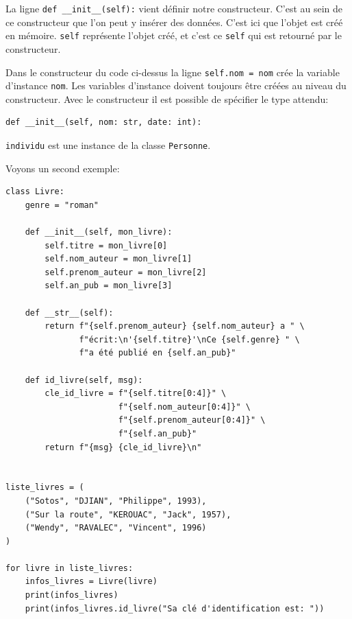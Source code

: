 \documentclass[a4paper,12pt]{book}
\begin{document}
La ligne \texttt{def \_\_init\_\_(self):} vient définir notre constructeur. C'est au sein de ce constructeur que l'on peut  y insérer des données. C'est ici que l'objet est créé en mémoire. \texttt{self} représente l'objet créé, et c'est ce \texttt{self} qui est retourné par le constructeur.
\medskip

Dans le constructeur du code ci-dessus la ligne \texttt{self.nom = nom} crée la variable d'instance \texttt{nom}. Les variables d'instance doivent toujours être créées au niveau du constructeur. Avec le constructeur il est possible de spécifier le type attendu:
\begin{lstlisting}
def __init__(self, nom: str, date: int):
\end{lstlisting}
\medskip

\texttt{individu} est une instance de la classe \texttt{Personne}.
\medskip

Voyons un second exemple:
\begin{lstlisting}[caption=La classe Livre complétée]
class Livre:
    genre = "roman"

    def __init__(self, mon_livre):
        self.titre = mon_livre[0]
        self.nom_auteur = mon_livre[1]
        self.prenom_auteur = mon_livre[2]
        self.an_pub = mon_livre[3]

    def __str__(self):
        return f"{self.prenom_auteur} {self.nom_auteur} a " \
               f"écrit:\n'{self.titre}'\nCe {self.genre} " \
               f"a été publié en {self.an_pub}"

    def id_livre(self, msg):
        cle_id_livre = f"{self.titre[0:4]}" \
                       f"{self.nom_auteur[0:4]}" \
                       f"{self.prenom_auteur[0:4]}" \
                       f"{self.an_pub}"
        return f"{msg} {cle_id_livre}\n"


liste_livres = (
    ("Sotos", "DJIAN", "Philippe", 1993),
    ("Sur la route", "KEROUAC", "Jack", 1957),
    ("Wendy", "RAVALEC", "Vincent", 1996)
)

for livre in liste_livres:
    infos_livres = Livre(livre)
    print(infos_livres)
    print(infos_livres.id_livre("Sa clé d'identification est: "))
\end{lstlisting}
\medskip
\end{document}
